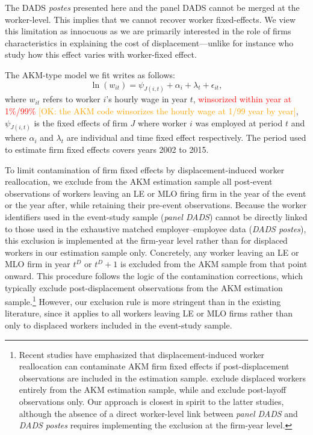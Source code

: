 The DADS \textit{postes} presented here and the panel DADS cannot be merged at the worker-level. This implies that we cannot recover worker fixed-effects. We view this limitation as innocuous as we are primarily interested in the role of firms characteristics in explaining the cost of displacement---unlike for instance \citep{helm2022} who study how this effect varies with worker-fixed effect.

The AKM-type model we fit writes as follows:
\begin{equation}\label{eq:akm_basics}
	\ln \left(w_{it}\right)=\psi_{J(i, t)}+\alpha_{i}+\lambda_{t}+\epsilon_{i t}, 
\end{equation}
where $w_{it}$ refers to worker $i$'s  hourly wage in year $t$, \textcolor{red}{winsorized within year at 1\%/99\%} \textcolor{orange}{[OK: the AKM code winsorizes the hourly wage at 1/99 year by year]}, $\psi_{J(i, t)}$ is the fixed effects of firm $J$ where worker $i$ was employed at period $t$ and where $\alpha_{i}$ and $\lambda_{t}$ are individual and time fixed effect respectively. The period used to estimate firm fixed effects covers years 2002 to 2015.

To limit contamination of firm fixed effects by displacement-induced worker reallocation, we exclude from the AKM estimation sample all post-event observations of workers leaving an LE or MLO firing firm in the year of the event or the year after, while retaining their pre-event observations. Because the worker identifiers used in the event-study sample (\textit{panel DADS}) cannot be directly linked to those used in the exhaustive matched employer--employee data (\textit{DADS postes}), this exclusion is implemented at the firm-year level rather than for displaced workers in our estimation sample only. Concretely, any worker leaving an LE or MLO firm in year $t^D$ or $t^D+1$ is excluded from the AKM sample from that point onward. This procedure follows the logic of the contamination corrections, which typically exclude post-displacement observations from the AKM estimation sample.\footnote{Recent studies have emphasized that displacement-induced worker reallocation can contaminate AKM firm fixed effects if post-displacement observations are included in the estimation sample. \citet{Lachowska2020} exclude displaced workers entirely from the AKM estimation sample, while \citet{moore2019firm} and \citet{Schmieder2020} exclude post-layoff observations only. Our approach is closest in spirit to the latter studies, although the absence of a direct worker-level link between \textit{panel DADS} and \textit{DADS postes} requires implementing the exclusion at the firm-year level.} However, our exclusion rule is more stringent than in the existing literature, since it applies to all workers leaving LE or MLO firms rather than only to displaced workers included in the event-study sample.

